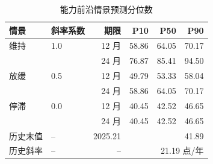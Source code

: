 \begin{table}[!htbp]
  \centering
  \caption{能力前沿情景预测分位数}
  \label{tab:q4_frontier}
  \songti{}
  \begin{tabular}{llrrrr}
    \toprule
    情景 & 斜率系数 & 期限 & P10 & P50 & P90 \\
    \midrule
    维持 & 1.0 & 12 月 & 58.86 & 64.05 & 70.17 \\
     &  & 24 月 & 76.87 & 85.41 & 94.50 \\
    \addlinespace[2pt]
    放缓 & 0.5 & 12 月 & 49.79 & 53.33 & 58.04 \\
     &  & 24 月 & 58.86 & 64.05 & 70.17 \\
    \addlinespace[2pt]
    停滞 & 0.0 & 12 月 & 40.45 & 42.52 & 46.65 \\
     &  & 24 月 & 40.45 & 42.52 & 46.65 \\
    \addlinespace[2pt]
    \midrule
    历史末值 & -- & 2025.21 & \multicolumn{3}{r}{41.89} \\
    历史斜率 & -- & -- & \multicolumn{3}{r}{21.19 点/年} \\
    \bottomrule
  \end{tabular}
\end{table}
